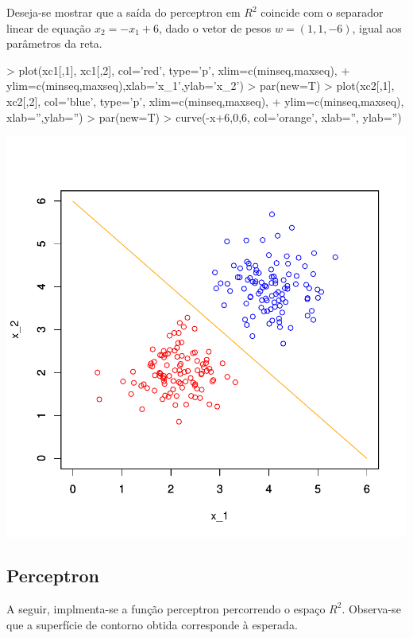 \documentclass{article}
\begin{document}
Deseja-se mostrar que a saída do perceptron em $R^2$ coincide com o separador linear de equação $x_{2} = - x_{1} + 6$, dado o vetor de pesos $w = (1,1,-6)$, igual aos parâmetros da reta.
\begin{Schunk}
\begin{Sinput}
> plot(xc1[,1], xc1[,2], col='red', type='p', xlim=c(minseq,maxseq), 
+      ylim=c(minseq,maxseq),xlab='x_1',ylab='x_2')
> par(new=T)
> plot(xc2[,1], xc2[,2], col='blue', type='p', xlim=c(minseq,maxseq), 
+      ylim=c(minseq,maxseq), xlab='',ylab='')
> par(new=T)
> curve(-x+6,0,6, col='orange', xlab='', ylab='')
\end{Sinput}
\end{Schunk}
\includegraphics{perceptron-002}

\subsection{Perceptron}
A seguir, implmenta-se a função perceptron percorrendo o espaço $R^2$. Observa-se que a superfície de contorno obtida corresponde à esperada.
\end{document}
